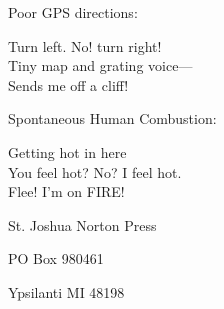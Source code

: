 \documentclass[12pt]{article}
\begin{document}
Poor GPS directions:

Turn left. No! turn right! \\
Tiny map and grating voice--- \\
Sends me off a cliff!

Spontaneous Human Combustion:

Getting hot in here \\
You feel hot? No? I feel hot. \\
Flee! I'm on FIRE!



\newpage

\thispagestyle{empty}
\vspace*{12cm}
\begin{sideways}
\Large{St. Joshua Norton Press}
\end{sideways}
\begin{sideways}
\Large{PO Box 980461}
\end{sideways}
\begin{sideways}
\Large{Ypsilanti MI 48198}
\end{sideways}
\end{document}
